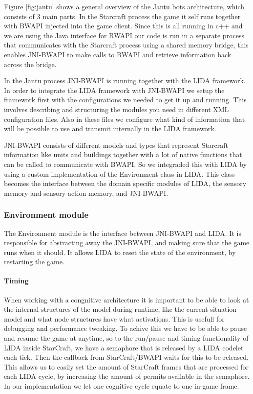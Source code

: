 Figure \ref{fig:jantu} shows a general overview of the Jantu bots architecture, which consists of 3 main parts. In the Starcraft process the game it self runs together with BWAPI injected into the game client. Since this is all running in c++ and we are using the Java interface for BWAPI our code is run in a separate process that communicates with the Starcraft process using a shared memory bridge, this enables JNI-BWAPI to make calls to BWAPI and retrieve information back across the bridge. 

In the Jantu process JNI-BWAPI is running together with the LIDA framework. In order to integrate the LIDA framework with JNI-BWAPI we setup the framework first with the configurations we needed to get it up and running. This involves describing and structuring the modules you need in different XML configuration files. Also in these files we configure what kind of information that will be possible to use and transmit internally in the LIDA framework. 

JNI-BWAPI consists of different models and types that represent Starcraft information like units and buildings together with a lot of native functions that can be called to communicate with BWAPI. So we integraded this with LIDA by using a custom implementation of the Environment class in LIDA. This class becomes the interface between the domain specific modules of LIDA, the sensory memory and sensory-action memory, and JNI-BWAPI. 


\subsubsection{Environment module}
The Environment module is the interface between JNI-BWAPI and LIDA. It is responsible for abstracting away the JNI-BWAPI, and making sure that the game runs when it should. It allows LIDA to reset the state of the environment, by restarting the game.
\paragraph{Timing} When working with a congnitive architecture it is important to be able to look at the internal structures of the model during runtime, like the current situation model and what node structures have what activations. This is usefull for debugging and performance tweaking. To achive this we have to be able to pause and resume the game at anytime, so to the run/pause and timing functionality of LIDA inside StarCraft, we have a semaphore that is released by a LIDA codelet each tick. Then the callback from StarCraft/BWAPI waits for this to be released. This allows us to easily set the amount of StarCraft frames that are processed for each LIDA cycle, by increasing the amount of permits available in the semaphore. In our implementation we let one cognitive cycle equate to one in-game frame.

